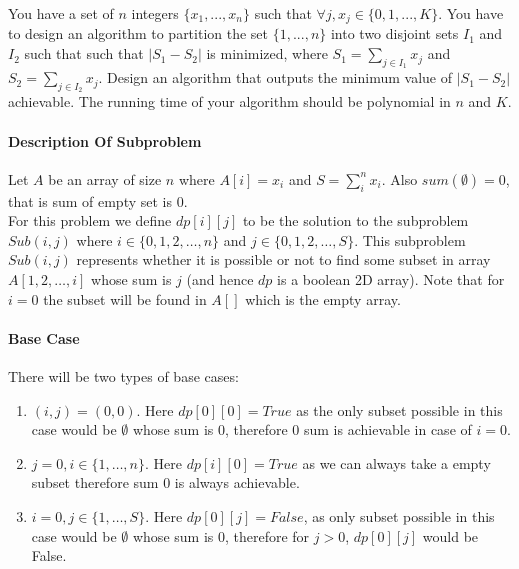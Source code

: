\documentclass[answers]{exam}
\newcommand{\nl}{\vspace{0.2cm}\\}
\begin{document}
\begin{questions}
\question[20] You have a set of $n$ integers $\{x_1, ..., x_n\}$ such that $\forall j, x_j \in \{0, 1, ..., K\}$.
You have to design an algorithm to partition the set $\{1, ..., n\}$ into two disjoint sets $I_1$ and $I_2$ such that such that $|S_1 - S_2|$ is minimized, where $S_1 = \sum_{j \in I_1} x_j$ and $S_2 = \sum_{j \in I_2} x_j$.
Design an algorithm that outputs the minimum value of $|S_1 - S_2|$ achievable.
The running time of your algorithm should be polynomial in $n$ and $K$.
\begin{solution}

\paragraph{Description Of Subproblem}
Let $A$ be an array of size $n$ where $A[i]=x_i$ and $S=\sum_{i}^{n}x_i$. Also $sum(\emptyset)=0$, that is sum of empty set is $0$.\nl
For this problem we define $dp[i][j]$ to be the solution to the subproblem $Sub(i, j)$ where $i \in \{0,1,2,\ldots,n\}$ and $j \in \{0,1,2,\ldots,S\}$. This subproblem $Sub(i, j)$ represents whether it is possible or not to find some subset in array $A[1,2,\ldots,i]$ whose sum is $j$ (and hence $dp$ is a boolean 2D array). Note that for $i=0$ the subset will be found in $A[]$ which is the empty array.
\paragraph{Base Case}
There will be two types of base cases:
\begin{enumerate}
    \item $(i, j) = (0, 0)$. Here $dp[0][0]=True$ as the only subset possible in this case would be $\emptyset$ whose sum is $0$, therefore $0$ sum is achievable in case of $i=0$.
    \item $j = 0, i \in \{1, \ldots, n\}$. Here $dp[i][0]=True$ as we can always take a empty subset therefore sum 0 is always achievable.
    \item $i = 0, j \in \{1, \ldots, S\}$. Here $dp[0][j]=False$, as only subset possible in this case would be $\emptyset$ whose sum is $0$, therefore for $j>0$, $dp[0][j]$ would be False.
\end{enumerate}


\end{solution}
\end{questions}
\end{document}
